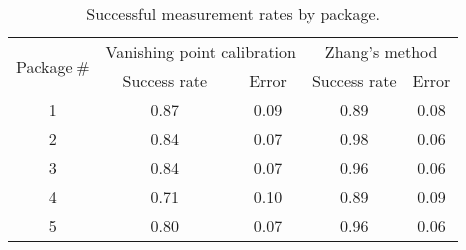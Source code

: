 \begin{table}
\centering
\begin{tabular}{@{} *5c @{}}
\toprule
\multirow{2}{*}{Package$~\#$} & \multicolumn{2}{c}{Vanishing point calibration} & \multicolumn{2}{c}{Zhang's method}\\ 
\cmidrule(r){2-3}
\cmidrule(r){4-5}
& Success rate & Error & Success rate & Error \\
\midrule
 1 & 0.87 & 0.09 & 0.89 & 0.08 \\ 
 2 & 0.84 & 0.07 & 0.98 & 0.06 \\
 3 & 0.84 & 0.07 & 0.96 & 0.06 \\
 4 & 0.71 & 0.10 & 0.89 & 0.09 \\
 5 & 0.80 & 0.07 & 0.96 & 0.06 \\
\bottomrule 
 \end{tabular}
 \caption{Successful measurement rates by package.}
\label{table:key_measurement_by_package}
\end{table}

